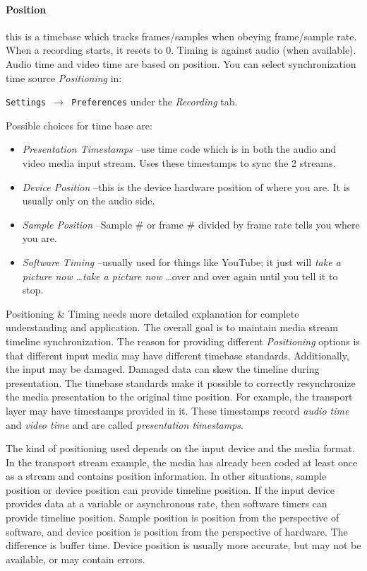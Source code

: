 \paragraph{Position} this is a timebase which tracks frames/samples when obeying frame/sample rate.  When a recording starts, it resets to 0.  Timing is against audio (when available).  Audio time and video time are based on position.
You can select synchronization time source \textit{Positioning} in:

\texttt{Settings $\rightarrow$ Preferences} under the \textit{Recording} tab.

\noindent Possible choices for time base are:

\begin{itemize}
    \item \textit{Presentation Timestamps} --use time code which is in both the audio and video media input stream. Uses these timestamps to sync the 2 streams.
    \item \textit{Device Position} --this is the device hardware position of where you are.  It is usually only on the audio side.
    \item \textit{Sample Position} --Sample $\#$ or frame $\#$ divided by frame rate tells you where you are.
    \item \textit{Software Timing} --usually used for things like YouTube; it just will \textit{take a picture now} \dots \textit{take a picture now} \dots over and over again until you tell it to stop.    
\end{itemize}

Positioning \& Timing needs more detailed explanation for complete understanding and application.  The overall goal is to maintain media stream timeline synchronization.  The reason for providing different \textit{Positioning} options is that different input media may have different timebase standards.  Additionally, the input may be damaged.  Damaged data can skew the timeline during presentation.  The timebase standards make it possible to correctly resynchronize the media presentation to the original time position.  For example, the transport layer may have timestamps provided in it.  These timestamps record \textit{audio time} and  \textit{video time} and are called \textit{presentation timestamps}.

The kind of positioning used depends on the input device and the media format.  In the transport stream example, the media has already been coded at least once as a stream and contains position information.  In other situations, sample position or device position can provide timeline position.  If the input device provides data at a variable or asynchronous rate, then software timers can provide timeline position.  Sample position is position from the perspective of software, and device position is position from the perspective of hardware.  The difference is buffer time.  Device position is usually more accurate, but may not be available, or may contain errors.

